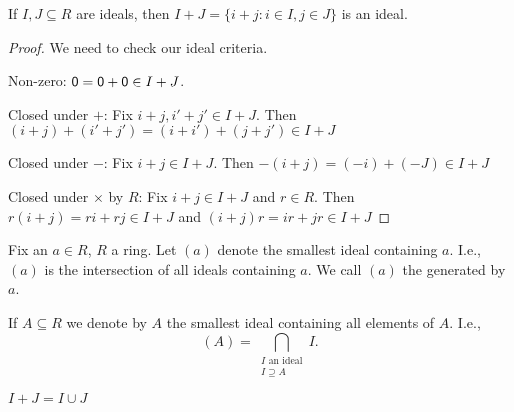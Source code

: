 \documentclass[notes.tex]{subfiles}
\begin{document}
\begin{proposition}
	If $I, J\subseteq R$ are ideals, then $I+J = \{i+j: i\in I, j\in J \}$ is an ideal.
\end{proposition}
\begin{proof}
	We need to check our ideal criteria.

	Non-zero: $\mathsf{0} = \mathsf{0} + \mathsf{0} \in I+J$.

	Closed under $+$: Fix $i+j, i'+j' \in I+J$. Then $(i+j) + (i'+j') = (i+i') + (j+j') \in I+J$

	Closed under $-$: Fix $i+j\in I+J$. Then $-(i+j) = (-i)+(-J) \in I+J$

	Closed under $\times$ by $R$:
	Fix $i+j\in I+J$ and $r\in R$.
	Then $r(i+j) = ri + rj \in I+J$ and $(i+j)r = ir + jr \in I+J$
\end{proof}

\begin{defn}
	Fix an $a\in R$, $R$ a ring. Let $(a)$ denote the smallest ideal containing $a$.
	I.e., $(a)$ is the intersection of all ideals containing $a$.
	We call $(a)$ the  generated by $a$.

	If $A\subseteq R$ we denote by $A$ the smallest ideal containing all elements of $A$. I.e., \[(A) = \bigcap_{\substack{I\text{ an ideal}\\I \supseteq A}}I.\]
\end{defn}
\begin{remark}
	$I+J = I\cup J$
\end{remark}
\end{document}
